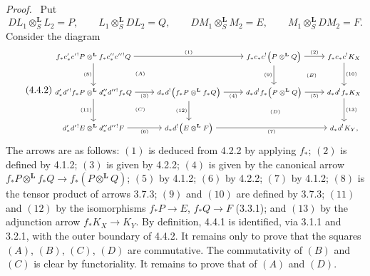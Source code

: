\documentclass[11pt]{article}
\newenvironment{prooftext}[1][Proof]{\par\noindent\emph{#1.}\ }{\par\medskip}
\begin{document}
\begin{prooftext}[Proof]
Put
\[
DL_1\otimes_S^{\mathbf L}L_2=P,\qquad
L_1\otimes_S^{\mathbf L}DL_2=Q,\qquad
DM_1\otimes_S^{\mathbf L}M_2=E,\qquad
M_1\otimes_S^{\mathbf L}DM_2=F.
\]
Consider the diagram
\begin{equation}
\tag{4.4.2}
{\scriptsize
\begin{tikzcd}[column sep=2.6em,row sep=2.6em]
f_*c'_*c'{}^!P\otimes^{\mathbf L} f_*c''_*c''{}^!Q
  \arrow[rr,"(1)"] \arrow[d,"(8)"'] &&
f_*c_*c^!\bigl(P\otimes^{\mathbf L}Q\bigr)
  \arrow[r,"(2)"] \arrow[d,"(9)"'] &
f_*c_*c^!K_X \arrow[d,"(10)"]\\
d'_*d'{}^!f_*P\otimes^{\mathbf L}d''_*d''{}^!f_*Q
  \arrow[r,"(3)"'] \arrow[d,"(11)"'] &
d_*d^!\bigl(f_*P\otimes^{\mathbf L}f_*Q\bigr)
  \arrow[r,"(4)"'] \arrow[d,"(12)"'] &
d_*d^!f_*\bigl(P\otimes^{\mathbf L}Q\bigr)
  \arrow[r,"(5)"'] &
d_*d^!f_*K_X \arrow[d,"(13)"]\\
d'_*d'{}^!E\otimes^{\mathbf L}d''_*d''{}^!F
  \arrow[r,"(6)"'] &
d_*d^!\bigl(E\otimes^{\mathbf L}F\bigr)
  \arrow[rr,"(7)"'] &&
d_*d^!K_Y,
\arrow[from=1-1,to=2-2, phantom, "\scriptstyle (A)"]
\arrow[from=1-3,to=2-4, phantom, "\scriptstyle (B)"]
\arrow[from=2-1,to=3-2, phantom, "\scriptstyle (C)"]
\arrow[from=2-2,to=3-4, phantom, "\scriptstyle (D)"]
\end{tikzcd}
}
\end{equation}
The arrows are as follows: $(1)$ is deduced from 4.2.2 by applying $f_*$; $(2)$ is defined by 4.1.2; $(3)$ is given by 4.2.2; $(4)$ is given by the canonical arrow $f_*P\otimes^{\mathbf L}f_*Q\longrightarrow f_*(P\otimes^{\mathbf L}Q)$; $(5)$ by 4.1.2; $(6)$ by 4.2.2; $(7)$ by 4.1.2; $(8)$ is the tensor product of arrows 3.7.3; $(9)$ and $(10)$ are defined by 3.7.3; $(11)$ and $(12)$ by the isomorphisms $f_*P\longrightarrow E$, $f_*Q\longrightarrow F$ (3.3.1); and $(13)$ by the adjunction arrow $f_*K_X\longrightarrow K_Y$. By definition, 4.4.1 is identified, via 3.1.1 and 3.2.1, with the outer boundary of 4.4.2. It remains only to prove that the squares $(A)$, $(B)$, $(C)$, $(D)$ are commutative. The commutativity of $(B)$ and $(C)$ is clear by functoriality. It remains to prove that of $(A)$ and $(D)$.


\end{prooftext}
\end{document}
